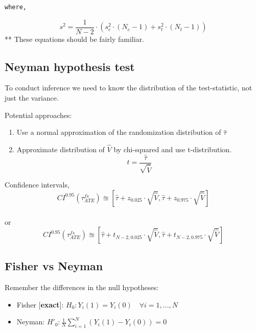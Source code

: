 \documentclass[
  letterpaper,
  DIV=11,
  numbers=noendperiod]{scrreprt}
\providecommand{\tightlist}{%
  \setlength{\itemsep}{0pt}\setlength{\parskip}{0pt}}\usepackage{longtable,booktabs,array}
\theoremstyle{definition}
\theoremstyle{remark}
\begin{document}
\begin{verbatim}
where, 
\end{verbatim}

\[
        s^2 = \frac{1}{N-2}\cdot\left(s^2_c\cdot(N_c-1)+s^2_t\cdot(N_t-1)\right)
\] ** These equations should be fairly familiar.

\hypertarget{neyman-hypothesis-test}{%
\subsection{Neyman hypothesis test}\label{neyman-hypothesis-test}}

To conduct inference we need to know the distribution of the
test-statistic, not just the variance.

Potential approaches:

\begin{enumerate}
\def\labelenumi{\arabic{enumi}.}
\tightlist
\item
  Use a normal approximation of the randomization distribution of
  \(\hat{\tau}\)
\item
  Approximate distribution of \(\hat{V}\) by chi-squared and use
  t-distribution. \[
        t = \frac{\hat{\tau}}{\sqrt{\hat{V}}}
  \]
\end{enumerate}

Confidence intervals, \[
    CI^{0.95}(\tau^{fs}_{ATE}) \approxeq \left[\hat{\tau}+z_{0.025}\cdot\sqrt{\hat{V}},\hat{\tau}+z_{0.975}\cdot\sqrt{\hat{V}}\right]
\]\\
or \[
        CI^{0.95}(\tau^{fs}_{ATE}) \approxeq \left[\hat{\tau}+t_{N-2,0.025}\cdot\sqrt{\hat{V}},\hat{\tau}+t_{N-2,0.975}\cdot\sqrt{\hat{V}}\right]
\]

\hypertarget{fisher-vs-neyman}{%
\subsection{Fisher vs Neyman}\label{fisher-vs-neyman}}

Remember the differences in the null hypotheses:

\par

\begin{itemize}
\tightlist
\item
  Fisher {[}\textbf{exact}{]}:
  \(H_0: Y_i(1)=Y_i(0) \quad\forall i=1,...,N\)
\item
  Neyman: \(H'_0: \frac{1}{N}\sum_{i=1}^{N}(Y_i(1)-Y_i(0))=0\)
\end{itemize}
\end{document}
